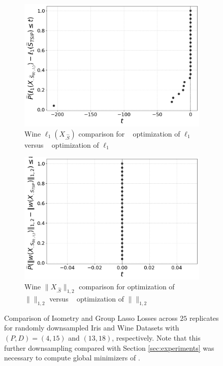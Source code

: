 \begin{figure}[t]
    \vspace{0.5cm}

    \begin{subfigure}[b]{0.45\textwidth}
        \centering
        \includegraphics[width=\textwidth]{../figures/wine_isometry_losses_iso_ecdf}
        \caption{Wine $\ell_1(X_{.\widehat S})$ comparison for \brute~ optimization of $\ell_1$ versus \tsip~ optimization of $\ell_1$}
        \label{fig:wine_isometry_losses_ecdf}
    \end{subfigure}
    \hfill
    \begin{subfigure}[b]{0.45\textwidth}
        \centering
        \includegraphics[width=\textwidth]{../figures/wine_isometry_losses_ts_ecdf}
        \caption{Wine $\|X_{.\widehat S}\|_{1,2}$ comparison for \brute optimization of $\|\|_{1,2}$ versus \tsip~ optimization of $\|\|_{1,2}$}
        \label{fig:wine_multitask_losses_ecdf}
    \end{subfigure}

    \caption{Comparison of Isometry and Group Lasso Losses across $25$ replicates for randomly downsampled Iris and Wine Datasets with $(P,D) = (4,15)$ and $(13, 18)$, respectively.
    Note that this further downsampling compared with Section \ref{sec:experiments} was necessary to compute global minimizers of \brute.
    }
    \label{fig:ecdf_comparison_losses}
\end{figure}

